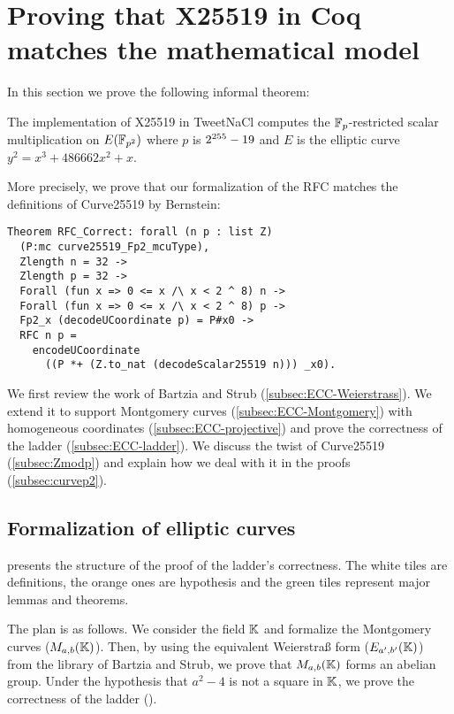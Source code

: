 \section{Proving that X25519 in Coq matches the mathematical model}
\label{sec:maths}

In this section we prove the following informal theorem:

\begin{informaltheorem}
  The implementation of X25519 in TweetNaCl computes the
  $\mathbb{F}_{p}$-restricted \xcoord scalar multiplication on $E(\mathbb{F}_{p^2})$ where $p$ is $2^{255}-19$
  and $E$ is the elliptic curve $y^2 = x^3 + 486662 x^2 + x$.
\end{informaltheorem}

More precisely, we prove that our formalization of the RFC matches the definitions of Curve25519 by Bernstein:
\begin{lstlisting}[language=Coq]
Theorem RFC_Correct: forall (n p : list Z)
  (P:mc curve25519_Fp2_mcuType),
  Zlength n = 32 ->
  Zlength p = 32 ->
  Forall (fun x => 0 <= x /\ x < 2 ^ 8) n ->
  Forall (fun x => 0 <= x /\ x < 2 ^ 8) p ->
  Fp2_x (decodeUCoordinate p) = P#x0 ->
  RFC n p =
    encodeUCoordinate
      ((P *+ (Z.to_nat (decodeScalar25519 n))) _x0).
\end{lstlisting}

We first review the work of Bartzia and Strub \cite{BartziaS14} (\ref{subsec:ECC-Weierstrass}).
We extend it to support Montgomery curves (\ref{subsec:ECC-Montgomery})
with homogeneous coordinates (\ref{subsec:ECC-projective}) and prove the
correctness of the ladder (\ref{subsec:ECC-ladder}).
We discuss the twist of Curve25519 (\ref{subsec:Zmodp}) and explain how we deal
with it in the proofs (\ref{subsec:curvep2}).

\subsection{Formalization of elliptic curves}
\label{subsec:ECC}

 presents the structure of the proof of the ladder's
correctness. The white tiles are definitions, the orange ones are hypothesis and
the green tiles represent major lemmas and theorems.

The plan is as follows.
We consider the field $\mathbb{K}$ and formalize the Montgomery curves ($M_{a,b}(\mathbb{K})$).
Then, by using the equivalent Weierstra{\ss} form ($E_{a',b'}(\mathbb{K})$) from the library of Bartzia and Strub,
we prove that $M_{a,b}(\mathbb{K})$ forms an abelian group.
Under the hypothesis that
$a^2 - 4$ is not a square in $\mathbb{K}$, we prove the correctness of the ladder ().


